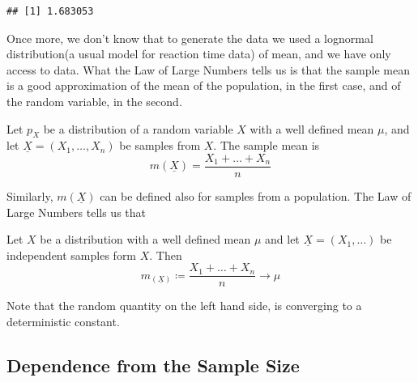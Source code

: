 \begin{knitrout}
\color{fgcolor}\begin{kframe}
\begin{alltt}
 \hlkwb{<-} 
 \hlkwb{<-} 
\end{alltt}
\begin{verbatim}
## [1] 1.683053
\end{verbatim}
\end{kframe}
\end{knitrout}
	Once more, we don't know that to generate the data we used a lognormal distribution(a usual model for reaction time data) of mean, and we have only access to data. 
	What the Law of Large Numbers tells us is that the sample mean is a good approximation of the mean of the population, in the first case, and of the random variable, in the second. 

	\begin{definition}
		\label{d:sample_mean} Let $p_X$ be a distribution of a random variable $X$ with a well defined mean $\mu$, and let  $\underline X = (X_1, \ldots, X_n)$ be samples from $X$. The sample mean is   
			\begin{equation}
				\label{e:sample_mean_x}
				m(\underline X ) = \frac{X_1 + \ldots + X_n }{n}
			\end{equation}
	\end{definition}
	Similarly, $m(\underline X)$ can be defined also for samples from a population. The Law of Large Numbers tells us that 
	\begin{theorem}
		Let $X$ be a distribution with a well defined mean $\mu$ and let $\underline X = (X_1 , \ldots )$ be independent samples form $X$. Then 
			\begin{equation}
			m_(\underline X) \coloneq \frac{X_1 + \ldots + X_n}{n} \to \mu
			\end{equation}
	\end{theorem}
	Note that the random quantity on the left hand side, is converging to a deterministic constant. 
	
	\subsection{ Dependence from the Sample Size}
		
